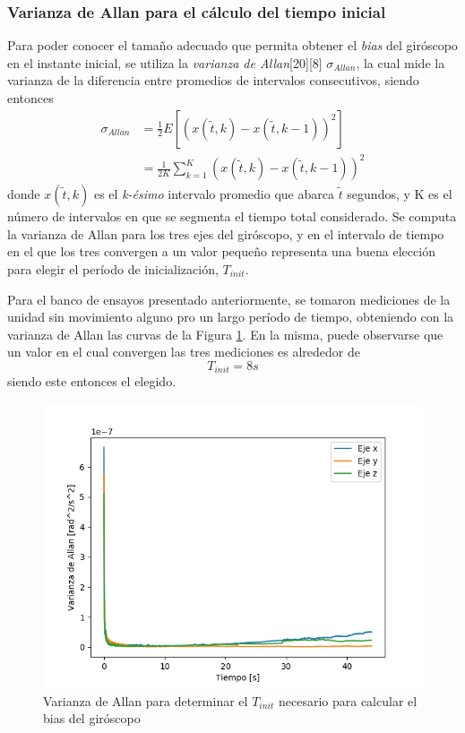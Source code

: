 \subsubsection{Varianza de Allan para el cálculo del tiempo inicial}
Para poder conocer el tamaño adecuado que permita obtener el \textit{bias} del giróscopo en el instante inicial, se utiliza la \textit{varianza de Allan}[20][8] $\sigma_{Allan}$, la cual mide la varianza de la diferencia entre promedios de intervalos consecutivos, siendo entonces
\begin{align}
    \sigma_{Allan} &= \frac{1}{2} E[(x(\tilde{t},k) - x(\tilde{t},k-1))^2] \\
    &= \frac{1}{2K}\sum_{k=1}^K(x(\tilde{t},k) - x(\tilde{t},k-1))^2
\end{align}
donde $x(\tilde{t},k)$ es el \textit{k-ésimo} intervalo promedio que abarca $\tilde{t}$ segundos, y K es el número de intervalos en que se segmenta el tiempo total considerado. Se computa la varianza de Allan para los tres ejes del giróscopo, y en el intervalo de tiempo en el que los tres convergen a un valor pequeño representa una buena elección para elegir el período de inicialización, $T_{init}$.

Para el banco de ensayos presentado anteriormente, se tomaron mediciones de la unidad sin movimiento alguno pro un largo período de tiempo, obteniendo con la varianza de Allan las curvas de la Figura \ref{fig:imugyrovariance}. En la misma, puede observarse que un valor en el cual convergen las tres mediciones es alrededor de
\begin{equation}
    T_{init} = 8 s
\end{equation}
siendo este entonces el elegido.
\begin{figure}
    \centering
    \includegraphics[width=\textwidth]{Img/IMUGyroVariance.png}
    \caption{Varianza de Allan para determinar el $T_{init}$ necesario para calcular el bias del giróscopo}
    \label{fig:imugyrovariance}
\end{figure}

